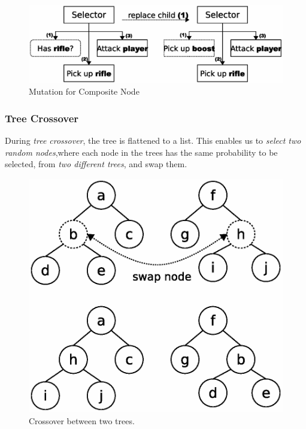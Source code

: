 \documentclass[a4paper, twocolumn]{article}
\begin{document}
        \begin{figure}[H]
            \centering
            \includegraphics[width=\linewidth]{share/child_replacement.eps}
            \caption{Mutation for Composite Node}
            \label{fig:child_replacement}
        \end{figure}

        \subsubsection*{Tree Crossover}

        During \emph{tree crossover}, the tree is flattened to a list. This enables us to \emph{select two random nodes},where each node in the trees has the same probability to be selected, from \emph{two different trees}, and swap them.

        \begin{figure}[H]
            \centering
            \includegraphics[width=\linewidth]{share/node_swapping.eps}
            \caption{Crossover between two trees.}
            \label{fig:child_crossover}
        \end{figure}
\end{document}
